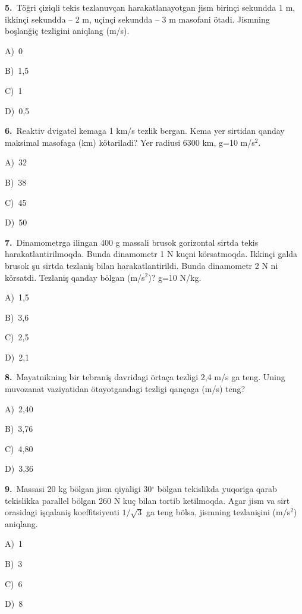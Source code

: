 \documentclass[11pt,a4paper]{article}
\newcommand{\opt}[2]{\hspace*{4mm}#1)\ #2\par}
\begin{document}
\noindent\begin{minipage}{\linewidth}
\textbf{5.}\ Töğri çiziqli tekis tezlanuvçan harakatlanayotgan jism birinçi sekundda 1 m, ikkinçi sekundda – 2 m, uçinçi sekundda – 3 m masofani ötadi. Jismning boşlanğiç tezligini aniqlang (m/s).\par\smallskip
\opt{A}{0}
\opt{B}{1,5}
\opt{C}{1}
\opt{D}{0,5}
\end{minipage}\vspace{9pt}\par
\noindent\begin{minipage}{\linewidth}
\textbf{6.}\ Reaktiv dvigatel kemaga 1 km/s tezlik bergan. Kema yer sirtidan qanday maksimal masofaga (km) kötariladi? Yer radiusi 6300 km, g=10 m/s$^{2}$.\par\smallskip
\opt{A}{32}
\opt{B}{38}
\opt{C}{45}
\opt{D}{50}
\end{minipage}\vspace{9pt}\par
\noindent\begin{minipage}{\linewidth}
\textbf{7.}\ Dinamometrga ilingan 400 g massali brusok gorizontal sirtda tekis harakatlantirilmoqda. Bunda dinamometr 1 N kuçni körsatmoqda. Ikkinçi galda brusok şu sirtda tezlaniş bilan harakatlantirildi. Bunda dinamometr 2 N ni körsatdi. Tezlaniş qanday bölgan (m/s$^{2}$)? g=10 N/kg.\par\smallskip
\opt{A}{1,5}
\opt{B}{3,6}
\opt{C}{2,5}
\opt{D}{2,1}
\end{minipage}\vspace{9pt}\par
\noindent\begin{minipage}{\linewidth}
\textbf{8.}\ Mayatnikning bir tebraniş davridagi örtaça tezligi 2,4 m/s ga teng. Uning muvozanat vaziyatidan ötayotgandagi tezligi qançaga (m/s) teng?\par\smallskip
\opt{A}{2,40}
\opt{B}{3,76}
\opt{C}{4,80}
\opt{D}{3,36}
\end{minipage}\vspace{9pt}\par
\noindent\begin{minipage}{\linewidth}
\textbf{9.}\ Massasi 20 kg bölgan jism qiyaligi 30$^\circ$ bölgan tekislikda yuqoriga qarab tekislikka parallel bölgan 260 N kuç bilan tortib ketilmoqda. Agar jism va sirt orasidagi işqalaniş koeffitsiyenti $1/\sqrt{3}$ ga teng bölsa, jismning tezlanişini (m/s$^{2}$) aniqlang.\par\smallskip
\opt{A}{1}
\opt{B}{3}
\opt{C}{6}
\opt{D}{8}
\end{minipage}\vspace{9pt}\par
\end{document}
